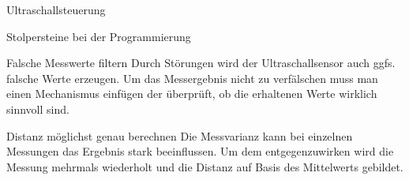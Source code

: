 \documentclass[12pt]{report}
\begin{document}
\begin{section}{Ultraschallsteuerung}
\begin{subsection}{Stolpersteine bei der Programmierung}
        \begin{paragraphwithnewline}{Falsche Messwerte filtern}
            Durch Störungen wird der Ultraschallsensor auch ggfs. falsche Werte
            erzeugen. Um das Messergebnis nicht zu verfälschen muss man einen
            Mechanismus einfügen der überprüft, ob die erhaltenen Werte wirklich
            sinnvoll sind. 
        \end{paragraphwithnewline}

        \begin{paragraphwithnewline}{Distanz möglichst genau berechnen}
            Die Messvarianz kann bei einzelnen Messungen das Ergebnis stark
            beeinflussen. Um dem entgegenzuwirken wird die Messung mehrmals
            wiederholt und die Distanz auf Basis des Mittelwerts gebildet.
        \end{paragraphwithnewline}


    \end{subsection}


\end{section}
\end{document}
